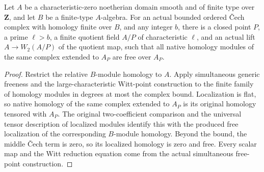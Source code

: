 \begin{lemma}
\label{lem:relative-arithmetic-cech-free-witt-point}
\leanok
Let $A$ be a characteristic-zero noetherian domain smooth and of finite
type over $\mathbf Z$, and let $B$ be a finite-type $A$-algebra. For an
actual bounded ordered Čech complex with homology finite over $B$, and
any integer $b$, there is a closed point $P$, a prime $\ell>b$, a finite
quotient field $A/P$ of characteristic $\ell$, and an actual lift
$A\to W_2(A/P)$ of the quotient map, such that all native homology
modules of the same complex extended to $A_P$ are free over $A_P$.
\end{lemma}
\begin{proof}
Restrict the relative $B$-module homology to $A$. Apply simultaneous
generic freeness and the large-characteristic Witt-point construction
to the finite family of homology modules in degrees at most the complex
bound. Localization is flat, so native homology of the same complex
extended to $A_P$ is its original homology tensored with $A_P$.
The original two-coefficient comparison and the universal tensor
description of localized modules identify this with the produced free
localization of the corresponding $B$-module homology. Beyond the bound,
the middle Čech term is zero, so its localized homology is zero and free.
Every scalar map and the Witt reduction equation come from the actual
simultaneous free-point construction.
\end{proof}
